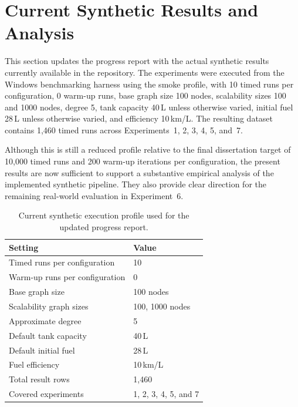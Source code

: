 \section{Current Synthetic Results and Analysis}
\label{sec:prelim_results}

This section updates the progress report with the actual synthetic results currently available in the repository.
The experiments were executed from the Windows benchmarking harness using the smoke profile, with 10 timed runs per configuration, 0 warm-up runs, base graph size 100 nodes, scalability sizes 100 and 1000 nodes, degree 5, tank capacity 40\,L unless otherwise varied, initial fuel 28\,L unless otherwise varied, and efficiency 10\,km/L.
The resulting dataset contains 1,460 timed runs across Experiments~1, 2, 3, 4, 5, and~7.

Although this is still a reduced profile relative to the final dissertation target of 10,000 timed runs and 200 warm-up iterations per configuration, the present results are now sufficient to support a substantive empirical analysis of the implemented synthetic pipeline.
They also provide clear direction for the remaining real-world evaluation in Experiment~6.

\begin{table}[H]
    \centering
    \caption{Current synthetic execution profile used for the updated progress report.}
    \label{tab:current_synth_profile}
    \begin{tabular}{ll}
        \toprule
        Setting & Value \\
        \midrule
        Timed runs per configuration & 10 \\
        Warm-up runs per configuration & 0 \\
        Base graph size & 100 nodes \\
        Scalability graph sizes & 100, 1000 nodes \\
        Approximate degree & 5 \\
        Default tank capacity & 40\,L \\
        Default initial fuel & 28\,L \\
        Fuel efficiency & 10\,km/L \\
        Total result rows & 1,460 \\
        Covered experiments & 1, 2, 3, 4, 5, and 7 \\
        \bottomrule
    \end{tabular}
\end{table}

